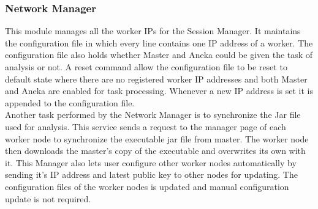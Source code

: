 \documentclass[AMA,STIX1COL]{WileyNJD-v2}
\begin{document}
\subsubsection{Network Manager}
This module manages all the worker IPs for the Session Manager. It maintains the configuration file in which every line contains one IP address of a worker. The configuration file also holds whether Master and Aneka could be given the task of analysis or not. A reset command allow the configuration file to be reset to default state where there are no registered worker IP addresses and both Master and Aneka are enabled for task processing. 
Whenever a new IP address is set it is appended to the configuration file. \\
Another task performed by the Network Manager is to synchronize the Jar file used for analysis. This service sends a request to the manager page of each worker node to synchronize the executable jar file from master. The worker node then downloads the master’s copy of the executable and overwrites its own with it. 
This Manager also lets user configure other worker nodes automatically by sending it’s IP address and latest public key to other nodes for updating. The configuration files of the worker nodes is updated and manual configuration update is not required.
\end{document}
